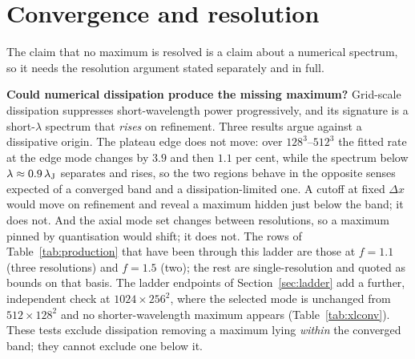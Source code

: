 \documentclass[usenatbib,twoside,twocolumn]{mnras}
\begin{document}
\section{Convergence and resolution}
\label{sec:convergence}

The claim that no maximum is resolved is a claim about a numerical spectrum, so it needs the resolution argument stated separately and in full.

\smallskip\noindent\textbf{Could numerical dissipation produce the missing maximum?} Grid-scale dissipation suppresses short-wavelength power progressively, and its signature is a short-$\lambda$ spectrum that \emph{rises} on refinement. Three results argue against a dissipative origin. The plateau edge does not move: over $128^3$--$512^3$ the fitted rate at the edge mode changes by $3.9$ and then $1.1$ per cent, while the spectrum below $\lambda\approx0.9\,\lambda_{\rm J}$ separates and rises, so the two regions behave in the opposite senses expected of a converged band and a dissipation-limited one. A cutoff at fixed $\Delta x$ would move on refinement and reveal a maximum hidden just below the band; it does not. And the axial mode set changes between resolutions, so a maximum pinned by quantisation would shift; it does not. The rows of Table~\ref{tab:production} that have been through this ladder are those at $f=1.1$ (three resolutions) and $f=1.5$ (two); the rest are single-resolution and quoted as bounds on that basis. The ladder endpoints of Section~\ref{sec:ladder} add a further, independent check at $1024\times256^2$, where the selected mode is unchanged from $512\times128^2$ and no shorter-wavelength maximum appears (Table~\ref{tab:xlconv}). These tests exclude dissipation removing a maximum lying \emph{within} the converged band; they cannot exclude one below it.
\end{document}
